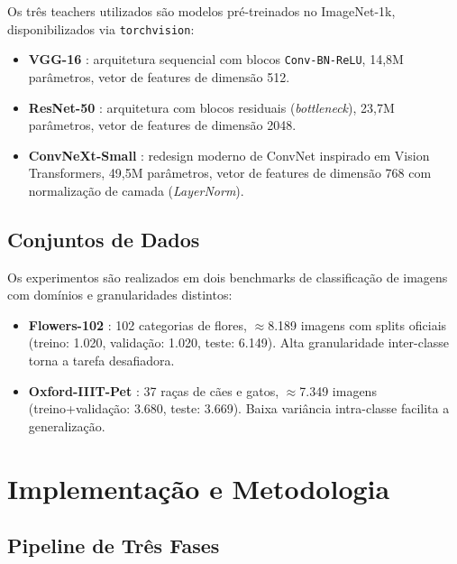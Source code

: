 \documentclass[
  article,            %
  11pt,               %
  letterpaper,        %
  oneside,            %
  sumario = tradicional
]{abntex2}
\begin{document}
Os três teachers utilizados são modelos pré-treinados no ImageNet-1k,
disponibilizados via \texttt{torchvision}:

\begin{itemize}
  \item \textbf{VGG-16} \cite{simonyan2015vgg}: arquitetura sequencial com blocos
    \texttt{Conv-BN-ReLU}, 14,8M parâmetros, vetor de features de dimensão 512.
  \item \textbf{ResNet-50} \cite{he2016deep}: arquitetura com blocos residuais
    (\textit{bottleneck}), 23,7M parâmetros, vetor de features de dimensão 2048.
  \item \textbf{ConvNeXt-Small} \cite{liu2022convnext}: redesign moderno de ConvNet
    inspirado em Vision Transformers, 49,5M parâmetros, vetor de features de
    dimensão 768 com normalização de camada (\textit{LayerNorm}).
\end{itemize}

\subsection{Conjuntos de Dados}

Os experimentos são realizados em dois benchmarks de classificação de imagens
com domínios e granularidades distintos:

\begin{itemize}
  \item \textbf{Flowers-102} \cite{nilsback2008flowers}: 102 categorias de flores,
    $\approx$8.189 imagens com splits oficiais (treino: 1.020, validação: 1.020,
    teste: 6.149). Alta granularidade inter-classe torna a tarefa desafiadora.
  \item \textbf{Oxford-IIIT-Pet} \cite{parkhi2012pets}: 37 raças de cães e gatos,
    $\approx$7.349 imagens (treino+validação: 3.680, teste: 3.669). Baixa
    variância intra-classe facilita a generalização.
\end{itemize}


\section{Implementação e Metodologia}
\label{sec:impl}

\subsection{Pipeline de Três Fases}
\end{document}
